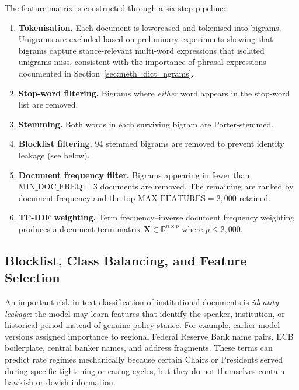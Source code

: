 The feature matrix is constructed through a six-step pipeline:

\begin{enumerate}
  \item \textbf{Tokenisation.} Each document is lowercased and
    tokenised into bigrams. Unigrams are excluded based on
    preliminary experiments showing that bigrams capture
    stance-relevant multi-word expressions that isolated unigrams
    miss, consistent with the importance of phrasal expressions
    documented in Section~\ref{sec:meth_dict_ngrams}.

  \item \textbf{Stop-word filtering.} Bigrams where \emph{either}
    word appears in the stop-word list are removed.

  \item \textbf{Stemming.} Both words in each surviving bigram are
    Porter-stemmed.

  \item \textbf{Blocklist filtering.} 94 stemmed bigrams are removed
    to prevent identity leakage (see below).

  \item \textbf{Document frequency filter.} Bigrams appearing in
    fewer than $\text{MIN\_DOC\_FREQ} = 3$ documents are removed.
    The remaining are ranked by document frequency and the top
    $\text{MAX\_FEATURES} = 2{,}000$ retained.

  \item \textbf{TF-IDF weighting.} Term frequency--inverse document
    frequency weighting produces a document-term matrix
    $\mathbf{X} \in \mathbb{R}^{n \times p}$ where
    $p \leq 2{,}000$.
\end{enumerate}


\subsection{Blocklist, Class Balancing, and Feature Selection}
\label{sec:meth_rf_blocklist}
\label{sec:meth_rf_balanced}
\label{sec:meth_lasso}

An important risk in text classification of institutional documents is
\emph{identity leakage}: the model may learn features that identify the
speaker, institution, or historical period instead of genuine policy
stance. For example, earlier model versions assigned importance to
regional Federal Reserve Bank name pairs, ECB boilerplate, central
banker names, and address fragments. These terms can predict rate
regimes mechanically because certain Chairs or Presidents served during
specific tightening or easing cycles, but they do not themselves contain
hawkish or dovish information.

